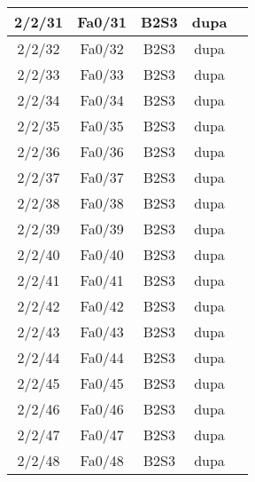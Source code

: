 \begin{center}
\begin{longtable}{|c|c|c|c|c|}
	2/2/31 & Fa0/31 & B2S3 & dupa \\ \hline
	2/2/32 & Fa0/32 & B2S3 & dupa \\ \hline
	2/2/33 & Fa0/33 & B2S3 & dupa \\ \hline
	2/2/34 & Fa0/34 & B2S3 & dupa \\ \hline
	2/2/35 & Fa0/35 & B2S3 & dupa \\ \hline
	2/2/36 & Fa0/36 & B2S3 & dupa \\ \hline
	2/2/37 & Fa0/37 & B2S3 & dupa \\ \hline
	2/2/38 & Fa0/38 & B2S3 & dupa \\ \hline
	2/2/39 & Fa0/39 & B2S3 & dupa \\ \hline
	2/2/40 & Fa0/40 & B2S3 & dupa \\ \hline
	2/2/41 & Fa0/41 & B2S3 & dupa \\ \hline
	2/2/42 & Fa0/42 & B2S3 & dupa \\ \hline
	2/2/43 & Fa0/43 & B2S3 & dupa \\ \hline
	2/2/44 & Fa0/44 & B2S3 & dupa \\ \hline
	2/2/45 & Fa0/45 & B2S3 & dupa \\ \hline
	2/2/46 & Fa0/46 & B2S3 & dupa \\ \hline
	2/2/47 & Fa0/47 & B2S3 & dupa \\ \hline
	2/2/48 & Fa0/48 & B2S3 & dupa \\ \hline
    \end{longtable}
\end{center}